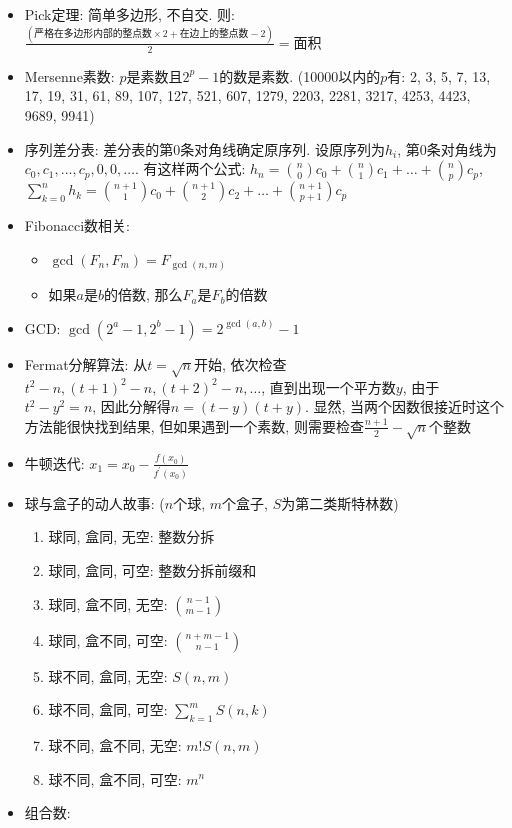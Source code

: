 \documentclass[landscape, twocolumn, 8pt, a4paper, twoside]{extarticle}
\begin{document}
\begin{itemize}
  \item Pick定理: 简单多边形, 不自交. 则: $\frac{(\mbox{严格在多边形内部的整点数}\times 2+\mbox{在边上的整点数}-2)}{2}=\mbox{面积}$
  \item Mersenne素数: $p$是素数且$2^p-1$的数是素数. (10000以内的$p$有: 2, 3, 5, 7, 13, 17, 19, 31, 61, 89, 107, 127, 521, 607, 1279, 2203, 2281, 3217, 4253, 4423, 9689, 9941)
  \item 序列差分表: 差分表的第$0$条对角线确定原序列. 
      设原序列为$h_i$, 第$0$条对角线为$c_0,c_1,\ldots,c_p,0,0,\ldots$. 
      有这样两个公式: 
      $h_n = \binom{n}{0}c_0 + \binom{n}{1}c_1 + \ldots + \binom{n}{p} c_p$, 
      $\sum_{k = 0}^{n}h_k = \binom{n+1}{1}c_0 + \binom{n+1}{2}c_2 + \ldots + \binom{n+1}{p+1}c_p$
  \item Fibonacci数相关: 
    \begin{itemize}
    \item $\gcd(F_n,F_m)=F_{\gcd(n,m)}$
    \item 如果$a$是$b$的倍数, 那么$F_a$是$F_b$的倍数
    \end{itemize}
  \item GCD:
    $\gcd(2^a-1,2^b-1)=2^{\gcd(a,b)}-1$
  \item Fermat分解算法: 
    从$t=\sqrt{n}$开始, 
    依次检查$t^2-n,(t+1)^2-n,(t+2)^2-n,\ldots$, 
    直到出现一个平方数$y$, 
    由于$t ^ 2 - y ^ 2 = n$, 
    因此分解得$n = (t -y)(t + y)$. 
    显然, 当两个因数很接近时这个方法能很快找到结果, 
    但如果遇到一个素数, 则需要检查$\frac{n + 1}{2} - \sqrt{n}$个整数
  \item 牛顿迭代:
    $x_1 = x_0 - \frac{f(x_0)}{f^\prime(x_0)}$
  \item 球与盒子的动人故事: ($n$个球, $m$个盒子, $S$为第二类斯特林数)
    \begin{enumerate}
    \item 球同, 盒同, 无空: 整数分拆
    \item 球同, 盒同, 可空: 整数分拆前缀和
    \item 球同, 盒不同, 无空: $\binom{n - 1}{m - 1}$
    \item 球同, 盒不同, 可空: $\binom{n + m - 1}{n - 1}$
    \item 球不同, 盒同, 无空: $S(n, m)$
    \item 球不同, 盒同, 可空: $\sum_{k = 1}^{m} S(n, k)$
    \item 球不同, 盒不同, 无空: $m! S(n, m)$
    \item 球不同, 盒不同, 可空: $m^n$
    \end{enumerate}
  \item 组合数:

\end{itemize}
\end{document}
